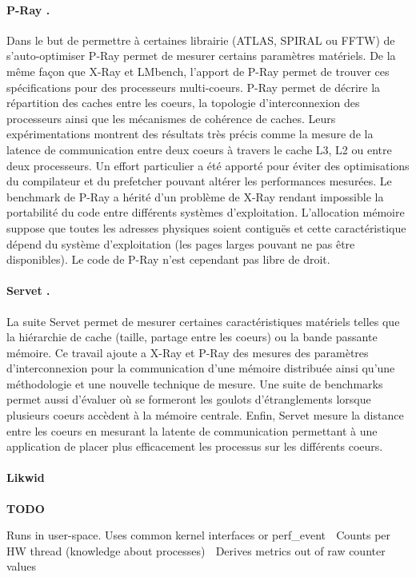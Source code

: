 \paragraph{P-Ray \cite{Duchateau2008}.} Dans le but de permettre à certaines librairie (ATLAS, SPIRAL ou FFTW) de s'auto-optimiser P-Ray permet de mesurer certains paramètres matériels. De la même façon que X-Ray et LMbench, l'apport de P-Ray permet de trouver ces spécifications pour des processeurs multi-coeurs. P-Ray permet de décrire la répartition des caches entre les coeurs, la topologie d'interconnexion des processeurs ainsi que les mécanismes de cohérence de caches. Leurs expérimentations montrent des résultats très précis comme la mesure de la latence de communication entre deux coeurs à travers le cache L3, L2 ou entre deux processeurs. Un effort particulier a été apporté pour éviter des optimisations du compilateur et du prefetcher pouvant altérer les performances mesurées. Le benchmark de P-Ray a hérité d'un problème de X-Ray rendant impossible la portabilité du code entre différents systèmes d'exploitation. L'allocation mémoire suppose que toutes les adresses physiques soient contiguës et cette caractéristique dépend du système d'exploitation (les pages larges pouvant ne pas être disponibles).
Le code de P-Ray n'est cependant pas libre de droit.

\paragraph{Servet \cite{gonzalez2010servet}.} La suite Servet permet de mesurer certaines caractéristiques matériels telles que la hiérarchie de cache (taille, partage entre les coeurs) ou la bande passante mémoire. Ce travail ajoute a X-Ray et P-Ray des mesures des paramètres d'interconnexion pour la communication d'une mémoire distribuée ainsi qu'une méthodologie et une nouvelle technique de mesure. Une suite de benchmarks permet aussi d'évaluer où se formeront les goulots d'étranglements lorsque plusieurs coeurs accèdent à la mémoire centrale. Enfin, Servet mesure la distance entre les coeurs en mesurant la latente de communication permettant à une application de placer plus efficacement les processus sur les différents coeurs.




\paragraph{Likwid}
\textbf{TODO}

\iffalse
Runs in user-space. Uses common kernel interfaces or perf_event
 Counts per HW thread (knowledge about processes)
 Derives metrics out of raw counter values

